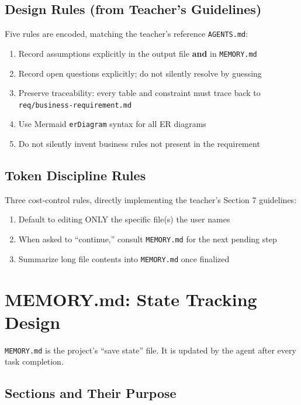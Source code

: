 \documentclass[12pt,a4paper]{article}
\begin{document}
\subsection{Design Rules (from Teacher's Guidelines)}

Five rules are encoded, matching the teacher's reference \texttt{AGENTS.md}:

\begin{enumerate}
    \item Record assumptions explicitly in the output file \textbf{and} in \texttt{MEMORY.md}
    \item Record open questions explicitly; do not silently resolve by guessing
    \item Preserve traceability: every table and constraint must trace back to \texttt{req/business-requirement.md}
    \item Use Mermaid \texttt{erDiagram} syntax for all ER diagrams
    \item Do not silently invent business rules not present in the requirement
\end{enumerate}

\subsection{Token Discipline Rules}

Three cost-control rules, directly implementing the teacher's Section 7 guidelines:

\begin{enumerate}
    \item Default to editing ONLY the specific file(s) the user names
    \item When asked to ``continue,'' consult \texttt{MEMORY.md} for the next pending step
    \item Summarize long file contents into \texttt{MEMORY.md} once finalized
\end{enumerate}

\section{MEMORY.md: State Tracking Design}
\label{sec:memory}

\texttt{MEMORY.md} is the project's ``save state'' file. It is updated by the agent after every task completion.

\subsection{Sections and Their Purpose}
\end{document}
